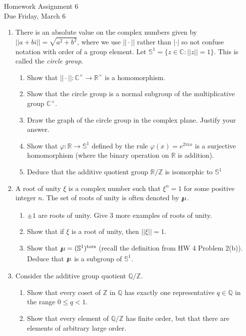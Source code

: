 \documentclass[11pt]{article}
\newcommand{\tors}{\mathrm{tors}}
\newcommand{\bC}{\mathbb{C}}
\newcommand{\bQ}{\mathbb{Q}}
\newcommand{\bR}{\mathbb{R}}
\newcommand{\bS}{\mathbb{S}}
\newcommand{\bZ}{\mathbb{Z}}
\newcommand{\bmu}{\mbox{$\raisebox{-0.59ex}
  {$l$}\hspace{-0.18em}\mu\hspace{-0.88em}\raisebox{-0.98ex}{\scalebox{2}
  {$\color{white}.$}}\hspace{-0.416em}\raisebox{+0.88ex}
  {$\color{white}.$}\hspace{0.46em}$}{}}
\begin{document}
\begin{center}
\Large {Homework Assignment 6}\\
\small {Due Friday, March 6}
\end{center}
\begin{enumerate}
  \item There is an absolute value on the complex numbers given by $||a+bi|| = \sqrt{a^2+b^2}$, where we use $||\cdot||$ rather than $|\cdot|$ so not confuse notation with order of a group element.  Let $\bS^1 = \{z\in\bC: ||z|| = 1\}$. This is called the \textit{circle group}.
  \begin{enumerate}
    \item Show that $||\cdot||:\bC^\times\to\bR^\times$ is a homomorphism.
    \item Show that the circle group is a normal subgroup of the multiplicative group $\bC^\times$.
    \item Draw the graph of the circle group in the complex plane.  Justify your answer.
    \item Show that $\varphi:\bR\to\bS^1$ defined by the rule $\varphi(x) = e^{2\pi i x}$ is a surjective homomorphism (where the binary operation on $\bR$ is addition).
    \item Deduce that the additive quotient group $\bR/\bZ$ is isomorphic to $\bS^1$
  \end{enumerate}
  \item A root of unity $\xi$ is a complex number such that $\xi^n = 1$ for some positive integer $n$.  The set of roots of unity is often denoted by $\bmu$.
  \begin{enumerate}
    \item $\pm1$ are roots of unity.  Give 3 more examples of roots of unity.
    \item Show that if $\xi$ is a root of unity, then $||\xi||=1$.
    \item Show that $\bmu = (\bS^1)^{\tors}$ (recall the definition from HW 4 Problem 2(b)).  Deduce that $\bmu$ is a subgroup of $\bS^1$.
  \end{enumerate}
  \item Consider the additive group quotient $\bQ/\bZ$.
  \begin{enumerate}
    \item Show that every coset of $\bZ$ in $\bQ$ has exactly one representative $q\in\bQ$ in the range $0\le q<1$.
    \item Show that every element of $\bQ/\bZ$ has finite order, but that there are elements of arbitrary large order.

\end{enumerate}
\end{enumerate}
\end{document}
